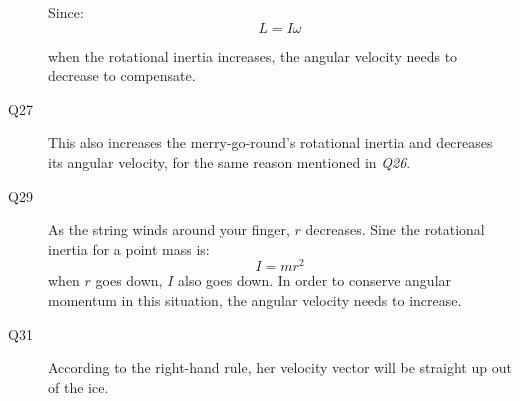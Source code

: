 \documentclass{exam}
\begin{document}
\begin{description}
Since:
\[
  L = I \omega
\]

when the rotational inertia increases, the angular velocity needs to decrease to compensate.

\item[Q27]
This also increases the merry-go-round's rotational inertia and decreases its angular velocity, for the same reason
mentioned in {\em Q26}.

\item[Q29]
As the string winds around your finger, $r$ decreases.  Sine the rotational inertia for a point mass is:
\[
  I = mr^2
\]
when $r$ goes down, $I$ also goes down.  In order to conserve angular momentum in this situation, the angular velocity
needs to increase. 

\item[Q31]
According to the right-hand rule, her velocity vector will be straight up out of the ice.

\end{description}
\end{document}
